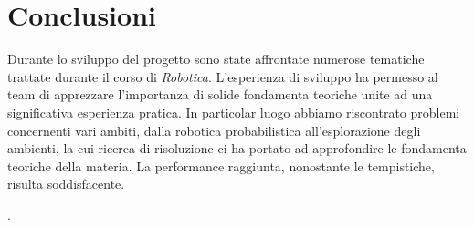 \documentclass[a4paper]{article}
\begin{document}
	\section{Conclusioni}\label{sec:Conclusioni}
	Durante lo sviluppo del progetto sono state affrontate numerose tematiche
	trattate durante il corso di \textit{Robotica}. L'esperienza di sviluppo ha
	permesso al team di apprezzare l'importanza di solide fondamenta teoriche
	unite ad una significativa esperienza pratica. In particolar luogo abbiamo
	riscontrato problemi concernenti vari ambiti, dalla robotica probabilistica
	all'esplorazione degli ambienti, la cui ricerca di risoluzione ci ha
	portato ad approfondire le fondamenta teoriche della materia. La
	performance raggiunta, nonostante le tempistiche, risulta soddisfacente.
	
	\newpage
	
	.
\end{document}
